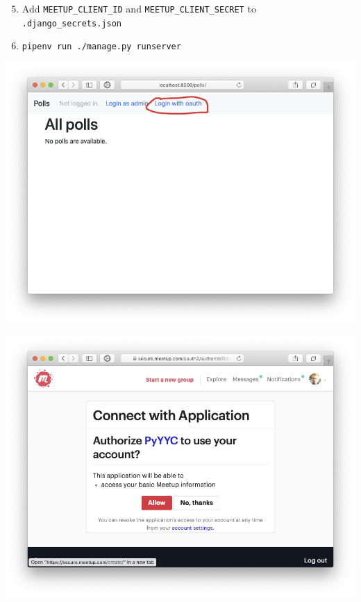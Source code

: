 \documentclass[xcolor=svgnames,17pt]{beamer}
\begin{document}
\begin{frame}[plain]
\begin{enumerate}
\setcounter{enumi}{4}
\item Add \texttt{MEETUP\_CLIENT\_ID} and \texttt{MEETUP\_CLIENT\_SECRET} to
\texttt{.django\_secrets.json}
\item \texttt{pipenv run ./manage.py runserver}
\end{enumerate}
\end{frame}

\begin{frame}[plain]
\includegraphics[width=0.9\paperwidth,center]{flow1.png}
\end{frame}

\begin{frame}[plain]
\includegraphics[width=0.9\paperwidth,center]{flow2.png}
\end{frame}
\end{document}
